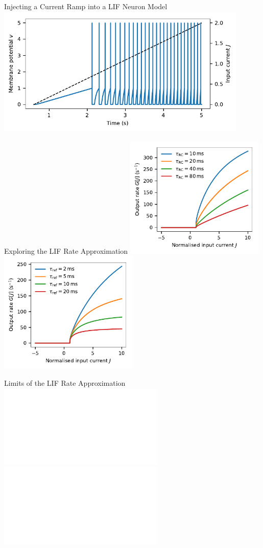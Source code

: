 \documentclass[handout,aspectratio=169]{beamer}
\begin{document}
\begin{frame}{Injecting a Current Ramp into a LIF Neuron Model}
	\centering
	\includegraphics[width=0.9\textwidth]{media/lif_neuron_ramp.pdf}

	\begin{overlayarea}{\textwidth}{1cm}
	\end{overlayarea}
\end{frame}

\begin{frame}{Exploring the LIF Rate Approximation}
	\centering
	\includegraphics[width=0.5\textwidth]{media/lif_neuron_rate_tau_rc.pdf}%
	\includegraphics[width=0.5\textwidth]{media/lif_neuron_rate_tau_ref.pdf}
\end{frame}

\begin{frame}{Limits of the LIF Rate Approximation}
	\centering
	\includegraphics<1>[width=\textwidth]{media/izhikevich_whichmod_figure1.pdf}
	\includegraphics<2>[width=\textwidth]{media/izhikevich_whichmod_figure2.pdf}
\end{frame}
\end{document}
